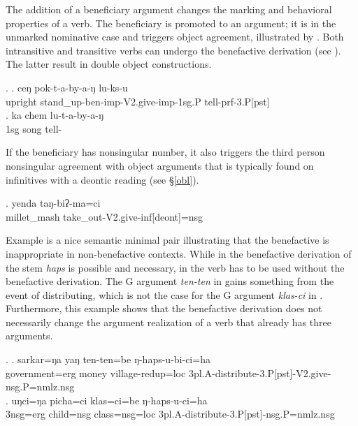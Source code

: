 The addition of  a beneficiary argument changes the marking and behavioral properties of a verb. The beneficiary is promoted to an argument; it is in the unmarked nominative case and triggers object agreement, illustrated by \Next. Both intransitive and transitive verbs can undergo the benefactive derivation (see \Next). The latter result in double object constructions.  

 \ex. \ag. ceŋ    pok-t-a-by-a-ŋ lu-ks-u\\
upright stand\_up-{\sc ben-imp-V2.give-imp-1sg.P} tell{\sc -prf-3.P[pst]}\\
 
 \bg. ka chem lu-t-a-by-a-ŋ\\
 {\sc 1sg} song tell-\\
 
 If the beneficiary has nonsingular number, it also triggers the third person nonsingular agreement with object arguments that is typically found  on infinitives with a deontic reading (see §\ref{obl}).

\exg. yenda taŋ-biʔ-ma=ci\\
millet\_mash take\_out-{\sc V2.give-inf[deont]=nsg}\\
 
 
Example \Next is a nice semantic minimal pair illustrating that the benefactive is inappropriate in non-benefactive contexts. While in \Next[a] the benefactive derivation of the stem \emph{haps}  is possible and necessary, in \Next[b] the verb has to be used without the benefactive derivation. The G argument  \emph{ten-ten}   in \Next[a] gains something from the event of distributing, which is not the case for the G argument \emph{klas-ci}  in \Next[b]. Furthermore, this example shows that the benefactive derivation does not necessarily change the argument realization of a verb that already has three arguments.

 \ex. \ag. sarkar=ŋa yaŋ ten-ten=be ŋ-haps-u-bi-ci=ha\\
government{\sc =erg} money village{\sc -redup=loc}	{\sc 3pl.A-}distribute-{\sc 3.P[pst]-V2.give-nsg.P=nmlz.nsg}\\
 \bg. uŋci=ŋa picha=ci klas=ci=be ŋ-haps-u-ci=ha\\
{\sc 3nsg=erg} child{\sc =nsg} class{\sc =nsg=loc}	{\sc 3pl.A-}distribute-{\sc 3.P[pst]-nsg.P=nmlz.nsg}\\


